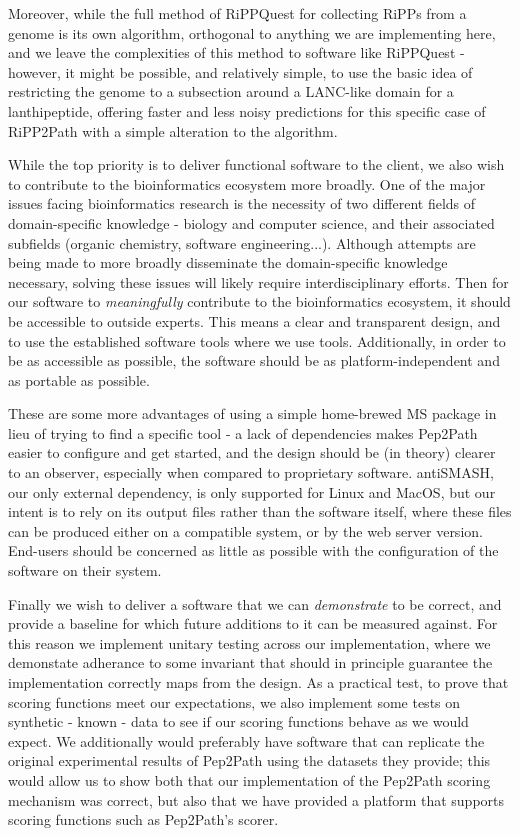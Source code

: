 \documentclass{l4proj}
\newcommand{\cit}[1]{\citep{#1}}
\begin{document}
Moreover, while the full method of RiPPQuest for collecting RiPPs from a genome is its own algorithm, orthogonal to anything we are implementing here, and we leave the complexities of this method to software like RiPPQuest - however, it might be possible, and relatively simple, to use the basic idea of restricting the genome to a subsection around a LANC-like domain for a lanthipeptide, offering faster and less noisy predictions for this specific case of RiPP2Path with a simple alteration to the algorithm.

While the top priority is to deliver functional software to the client, we also wish to contribute to the bioinformatics ecosystem more broadly. One of the major issues facing bioinformatics research is the necessity of two different fields of domain-specific knowledge - biology and computer science, and their associated subfields (organic chemistry, software engineering...). Although attempts are being made to more broadly disseminate the domain-specific knowledge necessary, \cit{msomics} solving these issues will likely require interdisciplinary efforts. Then for our software to \textit{meaningfully} contribute to the bioinformatics ecosystem, it should be accessible to outside experts. This means a clear and transparent design, and to use the established software tools where we use tools. Additionally, in order to be as accessible as possible, the software should be as platform-independent and as portable as possible. 

These are some more advantages of using a simple home-brewed MS package in lieu of trying to find a specific tool - a lack of dependencies makes Pep2Path easier to configure and get started, and the design should be (in theory) clearer to an observer, especially when compared to proprietary software. antiSMASH, our only external dependency, is only supported for Linux and MacOS, but our intent is to rely on its output files rather than the software itself, where these files can be produced either on a compatible system, or by the web server version. End-users should be concerned as little as possible with the configuration of the software on their system.

Finally we wish to deliver a software that we can \textit{demonstrate} to be correct, and provide a baseline for which future additions to it can be measured against. For this reason we implement unitary testing across our implementation, where we demonstate adherance to some invariant that should in principle guarantee the implementation correctly maps from the design. As a practical test, to prove that scoring functions meet our expectations, we also implement some tests on synthetic - known - data to see if our scoring functions behave as we would expect. We additionally would preferably have software that can replicate the original experimental results of Pep2Path using the datasets they provide; this would allow us to show both that our implementation of the Pep2Path scoring mechanism was correct, but also that we have provided a platform that supports scoring functions such as Pep2Path's scorer.
\end{document}
